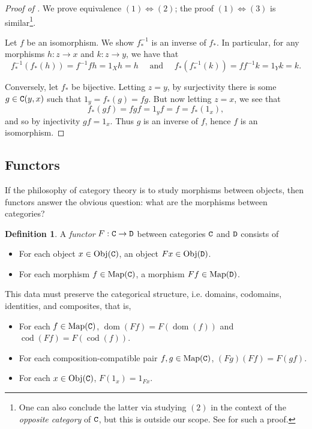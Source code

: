 \documentclass[11 pt]{amsart}
\theoremstyle{plain}   %
\theoremstyle{definition}
\newtheorem{defn}{Definition}[section]
\theoremstyle{remark}
\numberwithin{equation}{section}
\DeclareMathOperator{\dom}{dom}
\DeclareMathOperator{\cod}{cod}
\newcommand{\cat}[1]{{\normalfont\texttt{#1}}}
\newcommand{\Obj}[1]{\text{Obj}(\cat{#1})}
\newcommand{\Map}[1]{\text{Map}(\cat{#1})}
\begin{document}
\begin{proof}[Proof of ]
	We prove equivalence $(1)\Leftrightarrow(2)$; the proof $(1)\Leftrightarrow(3)$ is
	similar\footnote{One can also conclude the latter via studying $(2)$ in the
		context of the \emph{opposite category} of $\cat{C}$, but this is outside our
		scope. See \cite[Lemma 1.2.3]{Riehl} for such a proof.}.

	Let $f$ be an isomorphism. We show $f^{-1}_*$ is an inverse of
	$f_*$. In particular, for any morphisms $h: z\rightarrow x$ and $k:
		z\rightarrow y$, we have that
	$$f^{-1}_*(f_*(h)) = f^{-1}fh = 1_Xh = h
		\quad
		\text{ and }
		\quad
		f_*(f^{-1}_*(k)) = ff^{-1}k = 1_Yk = k.$$

	Conversely, let $f_*$ be bijective. Letting $z = y$, by surjectivity there is
	some $g\in\cat{C}(y, x)$ such that $1_y = f_*(g) = fg$. But now letting $z =
		x$, we see that $$f_*(gf) = fgf = 1_yf = f = f_*(1_x),$$ and so by injectivity
	$gf = 1_x$. Thus $g$ is an inverse of $f$, hence $f$ is an isomorphism.
	\qedhere

\end{proof}

\subsection{Functors}

If the philosophy of category theory is to study morphisms between objects, then
functors answer the obvious question: what are the morphisms between categories?

\begin{defn}
	A \emph{functor} $F: \cat{C}\rightarrow\cat{D}$ between
	categories $\cat{C}$ and $\cat{D}$ consists of
	\begin{itemize}
		\item For each object $x\in\Obj{C}$, an object $Fx\in\Obj{D}$.
		\item For each morphism $f\in\Map{C}$, a morphism $Ff\in\Map{D}$.
	\end{itemize}

	This data must preserve the categorical structure, i.e. domains, codomains,
	identities, and composites, that is,

	\begin{itemize}
		\item For each $f\in\Map{C}$, $\dom(Ff) = F(\dom(f))$ and $\cod(Ff) =
			      F(\cod(f))$.
		\item For each composition-compatible pair $f,g\in\Map{C}$, $(Fg)(Ff) =
			      F(gf)$.
		\item For each $x\in\Obj{C}$, $F(1_x) = 1_{Fx}$.
	\end{itemize}
\end{defn}
\end{document}
